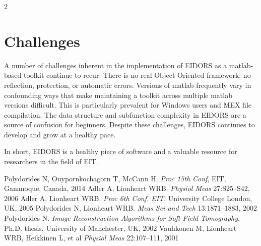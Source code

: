\documentclass[10pt,a4paper]{article}
\renewenvironment{thebibliography}[1]{%
    \begin{oldthebibliography}{#1}%
      \setlength{\parskip}{0ex}%
      \setlength{\itemsep}{0ex}%
  }%
  {%
    \end{oldthebibliography}%
  }
\begin{document}
\begin{multicols}{2}
\section{Challenges}
A number of challenges inherent in the implementation of EIDORS as a matlab-based toolkit continue to recur.
There is no real Object Oriented framework: no reflection, protection, or
  automatic errors.
Versions of matlab frequently vary in confounding ways that make
  maintaining a toolkit across multiple matlab versions difficult. This is
  particularly prevalent for Windows users and MEX file compilation.
The data structure and subfunction complexity in EIDORS are a
  source of confusion for beginners.
Despite these challenges, EIDORS continues to develop and grow at a healthy pace.

In short, EIDORS is a healthy piece of software and a valuable resource for researchers in the field of EIT.

\footnotesize
\begin{thebibliography}{}
Polydorides N, Ouypornkochagorn T, McCann H. 
{\em Proc 15th Conf}, EIT, Gananoque, Canada, 2014
Adler A, Lionheart WRB. {\em Physiol Meas} 27:S25--S42, 2006
Adler A, Lionheart WRB. 
{\em Proc 6th Conf. EIT}, University College London, UK, 2005
   Polydorides N, Lionheart WRB.
   {\em Meas Sci and Tech} 13:1871--1883, 2002
   Polydorides N.
 {\em Image Reconstruction Algorithms for Soft-Field Tomography}, Ph.D. thesis, University of Manchester, UK, 2002
   Vauhkonen M, Lionheart WRB, Heikkinen L, et al
   {\em  Physiol Meas} 22:107--111, 2001
\end{thebibliography}
\end{multicols}
\end{document}
